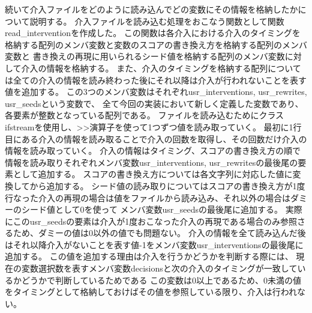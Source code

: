 続いて介入ファイルをどのように読み込んでどの変数にその情報を格納したかについて説明する。
介入ファイルを読み込む処理をおこなう関数として関数read\_interventionを作成した。
この関数は各介入における介入のタイミングを格納する配列のメンバ変数と変数のスコアの書き換え方を格納する配列のメンバ変数と
書き換えの再現に用いられるシード値を格納する配列のメンバ変数に対して介入の情報を格納する。
また、介入のタイミングを格納する配列については全ての介入の情報を読み終わった後にそれ以降は介入が行われないことを表す値を追加する。
この3つのメンバ変数はそれぞれusr\_interventions, usr\_rewrites, usr\_seedsという変数で、
全て今回の実装において新しく定義した変数であり、各要素が整数となっている配列である。
ファイルを読み込むためにクラスifstreamを使用し、>>演算子を使って1つずつ値を読み取っていく。
最初に1行目にある介入の情報を読み取ることで介入の回数を取得し、その回数だけ介入の情報を読み取っていく。
介入の情報はタイミング、スコアの書き換え方の順で情報を読み取りそれぞれメンバ変数usr\_interventions, usr\_rewritesの最後尾の要素として追加する。
スコアの書き換え方については各文字列に対応した値に変換してから追加する。
シード値の読み取りについてはスコアの書き換え方が1度行なった介入の再現の場合は値をファイルから読み込み、それ以外の場合はダミーのシード値として0を使って
メンバ変数usr\_seedsの最後尾に追加する。
実際にこのusr\_seedsの要素は介入が1度おこなった介入の再現である場合のみ参照さるため、ダミーの値は0以外の値でも問題ない。
介入の情報を全て読み込んだ後はそれ以降介入がないことを表す値-1をメンバ変数usr\_interventionsの最後尾に追加する。
この値を追加する理由は介入を行うかどうかを判断する際には、
現在の変数選択数を表すメンバ変数decisionsと次の介入のタイミングが一致しているかどうかで判断しているためである
この変数は0以上であるため、0未満の値をタイミングとして格納しておけばその値を参照している限り、介入は行われない。


